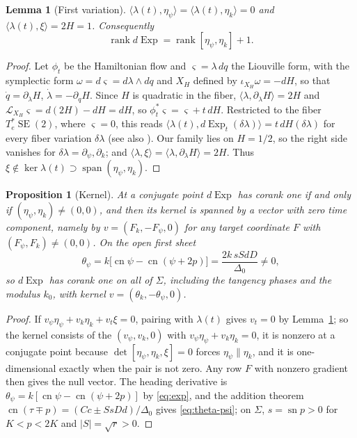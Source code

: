 \documentclass[11pt]{article}
\newtheorem{lemma}[theorem]{Lemma}
\newtheorem{proposition}[theorem]{Proposition}
\theoremstyle{remark}
\newcommand{\SE}{\operatorname{SE}(2)}
\newcommand{\sn}{\operatorname{sn}}
\newcommand{\cn}{\operatorname{cn}}
\newcommand{\Exp}{\operatorname{Exp}}
\newcommand{\rk}{\operatorname{rank}}
\begin{document}
\begin{lemma}[First variation]\label{lem:first-variation}
$\langle\lambda(t),\eta_\psi\rangle=\langle\lambda(t),\eta_k\rangle=0$ and
$\langle\lambda(t),\xi\rangle=2H=1$.  Consequently
\[
 \rk d\Exp=\rk[\eta_\psi,\eta_k]+1 .
\]
\end{lemma}
\begin{proof}
Let $\phi_t$ be the Hamiltonian flow and $\varsigma=\lambda\,dq$ the Liouville
form, with the symplectic form $\omega=d\varsigma=d\lambda\wedge dq$ and
$X_H$ defined by $\iota_{X_H}\omega=-dH$, so that $\dot q=\partial_\lambda H$,
$\dot\lambda=-\partial_qH$.  Since $H$ is quadratic in the fiber, $\langle\lambda,\partial_\lambda H\rangle=2H$
and $\mathcal L_{X_H}\varsigma=d(2H)-dH=dH$, so $\phi_t^*\varsigma=\varsigma+t\,dH$.
Restricted to the fiber $T^*_e\SE$, where $\varsigma=0$, this reads
$\langle\lambda(t),d\Exp_t(\delta\lambda)\rangle=t\,dH(\delta\lambda)$ for
every fiber variation $\delta\lambda$
(see also \cite[Ch.~8]{AgrachevBarilariBoscain2020}).  Our family lies on
$H=1/2$, so the right side vanishes for $\delta\lambda=\partial_\psi,\partial_k$;
and $\langle\lambda,\xi\rangle=\langle\lambda,\partial_\lambda H\rangle=2H$.
Thus $\xi\notin\ker\lambda(t)\supset\operatorname{span}(\eta_\psi,\eta_k)$.
\end{proof}

\begin{proposition}[Kernel]\label{prop:kernel}
At a conjugate point $d\Exp$ has corank one if and only if
$(\eta_\psi,\eta_k)\ne(0,0)$, and then its kernel is spanned by a vector
with zero time component, namely by $v=(F_k,-F_\psi,0)$ for any target
coordinate $F$ with $(F_\psi,F_k)\ne(0,0)$.  On the open first sheet
\begin{equation}\label{eq:theta-psi}
 \theta_\psi=k\bigl[\cn\psi-\cn(\psi+2p)\bigr]
 =\frac{2k\,sSdD}{\Delta_0}\ne0,
\end{equation}
so $d\Exp$ has corank one on all of $\Sigma$, including the tangency
phases and the modulus $k_0$, with kernel
$v=(\theta_k,-\theta_\psi,0)$.
\end{proposition}
\begin{proof}
If $v_\psi\eta_\psi+v_k\eta_k+v_t\xi=0$, pairing with $\lambda(t)$ gives
$v_t=0$ by Lemma~\ref{lem:first-variation}; so the kernel consists of the
$(v_\psi,v_k,0)$ with $v_\psi\eta_\psi+v_k\eta_k=0$, it is nonzero at a
conjugate point because $\det[\eta_\psi,\eta_k,\xi]=0$ forces
$\eta_\psi\parallel\eta_k$, and it is one-dimensional exactly when the pair
is not zero.  Any row
$F$ with nonzero gradient then gives the null vector.  The heading
derivative is $\theta_\psi=k[\cn\psi-\cn(\psi+2p)]$ by \eqref{eq:exp}, and
the addition theorem $\cn(\tau\mp p)=(Cc\pm SsDd)/\Delta_0$ gives
\eqref{eq:theta-psi}; on $\Sigma$, $s=\sn p>0$ for $K<p<2K$ and
$|S|=\sqrt r>0$.
\end{proof}
\end{document}
